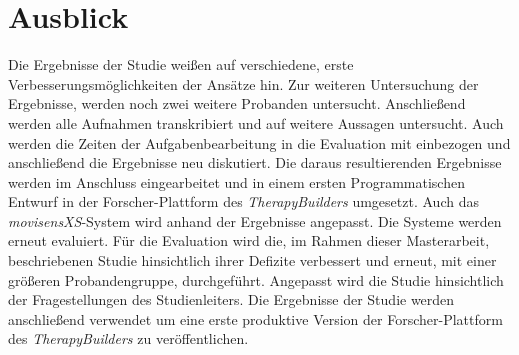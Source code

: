 \section{Ausblick}
Die Ergebnisse der Studie weißen auf verschiedene, erste Verbesserungsmöglichkeiten der Ansätze hin. Zur weiteren Untersuchung der Ergebnisse, werden noch zwei weitere Probanden untersucht. Anschließend werden alle Aufnahmen transkribiert und auf weitere Aussagen untersucht. Auch werden die Zeiten der Aufgabenbearbeitung in die Evaluation mit einbezogen und anschließend die Ergebnisse neu diskutiert. Die daraus resultierenden Ergebnisse werden im Anschluss eingearbeitet und in einem ersten Programmatischen Entwurf in der Forscher-Plattform des \emph{TherapyBuilders} umgesetzt. Auch das \emph{movisensXS}-System wird anhand der Ergebnisse angepasst. Die Systeme werden erneut evaluiert. Für die Evaluation wird die, im Rahmen dieser Masterarbeit, beschriebenen Studie hinsichtlich ihrer Defizite verbessert und erneut, mit einer größeren Probandengruppe, durchgeführt. Angepasst wird die Studie hinsichtlich der Fragestellungen des Studienleiters. Die Ergebnisse der Studie werden anschließend verwendet um eine erste produktive Version der Forscher-Plattform des \emph{TherapyBuilders} zu veröffentlichen.